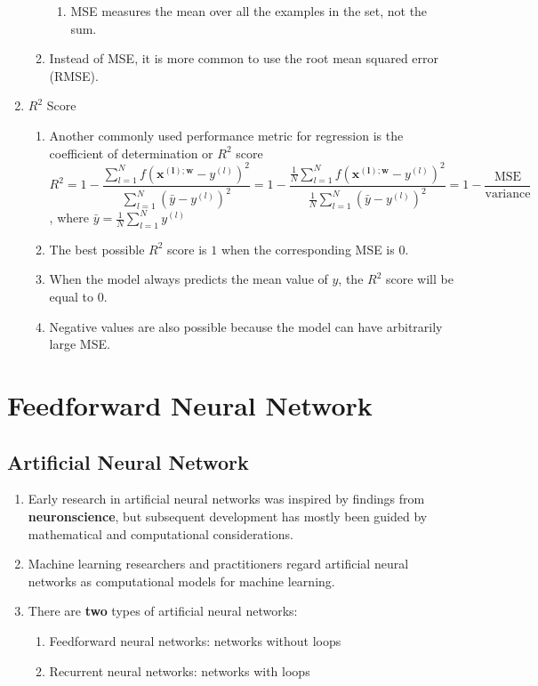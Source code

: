 \documentclass[11pt]{article}
\begin{document}
\begin{enumerate}
\begin{enumerate}
\begin{enumerate}
\item MSE measures the mean over all the examples in the set, not the sum.
\end{enumerate}
\item Instead of MSE, it is more common to use the root mean squared error (RMSE).
\end{enumerate}
\item $R^2$ Score
\begin{enumerate}
\item Another commonly used performance metric for regression is the coefficient of determination or $R^2$ score $$R^2 = 1 - \frac{\sum_{l=1}^{N}f(\mathbf{x^{(l); w}}- y^{(l)})^2}{\sum_{l=1}^{N} (\bar{y} - y^{(l)})^2} = 1 - \frac{\frac{1}{N}\sum_{l=1}^{N}f(\mathbf{x^{(l); w}}- y^{(l)})^2}{\frac{1}{N}\sum_{l=1}^{N} (\bar{y} - y^{(l)})^2} = 1 - \frac{\text{MSE}}{\text{variance}}$$, where $\bar{y} = \frac{1}{N} \sum_{l=1}^{N} y^{(l)}$
\item The best possible $R^2$ score is $1$ when the corresponding MSE is 0.
\item When the model always predicts the mean value of $y$, the $R^2$ score will be equal to $0$.
\item Negative values are also possible because the model can have arbitrarily large MSE.
\end{enumerate}
\end{enumerate}
\newpage
\section{Feedforward Neural Network}
\subsection{Artificial Neural Network}
\begin{enumerate}
\item Early research in artificial neural networks was inspired by findings from \textbf{neuronscience}, but subsequent development has mostly been guided by mathematical and computational considerations.
\item Machine learning researchers and practitioners regard artificial neural networks as computational models for machine learning.
\item There are \textbf{two} types of artificial neural networks:
\begin{enumerate}
\item Feedforward neural networks: networks without loops
\item Recurrent neural networks: networks with loops
\end{enumerate}
\end{enumerate}
\end{document}
